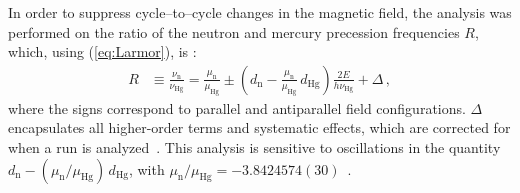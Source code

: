 In order to suppress cycle--to--cycle changes in the magnetic field, the analysis was performed on the ratio of the neutron and mercury precession frequencies $R$, which, using (\ref{eq:Larmor}), is \cite{Baker2014}:
\begin{align}
  \label{eq:R}
  R &\equiv \frac{\nu_\mathrm{n}}{\nu_\textrm{Hg}} = \frac{\mu_\mathrm{n}}{\mu_\textrm{Hg}} \pm \left( d_\mathrm{n} - \frac{\mu_\mathrm{n}}{\mu_\textrm{Hg}} \, d_\textrm{Hg} \right) \frac{2 E}{ h  \nu_\textrm{Hg}} + \Delta \, ,
\end{align}
where the signs correspond to parallel and antiparallel field configurations. $\Delta$ encapsulates all higher-order terms and systematic effects, which are corrected for when a run is analyzed~\cite{Pendlebury2015}.
This analysis is sensitive to oscillations in the quantity $d_\mathrm{n} - \left( \mu_\mathrm{n} / \mu_\textrm{Hg} \right) \, d_\textrm{Hg}$, with $\mu_\mathrm{n} / \mu_\textrm{Hg} = -3.8424574(30)$~\cite{Afach2014magmoment}.



